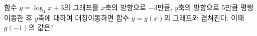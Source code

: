 함수 $y=\log_4 x+3$의 그래프를 $x$축의 방향으로 $-3$만큼, $y$축의 방향으로 $5$만큼 평행이동한 후 $y$축에 대하여 대칭이동하면 함수 $y=g(x)$의 그래프와 겹쳐진다. 이때 $g(-1)$의 값은?
